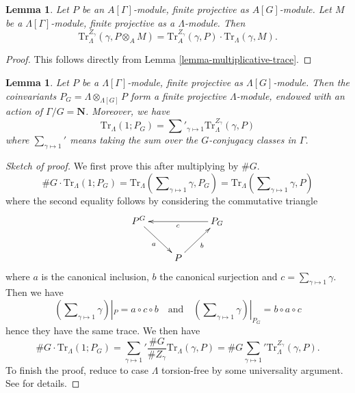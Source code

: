 \documentclass{stacks-project}
\theoremstyle{plain}
\newtheorem{lemma}[subsection]{Lemma}
\theoremstyle{definition}
\theoremstyle{remark}
\numberwithin{equation}{subsection}
\begin{document}
\begin{lemma}
\label{lemma-weak-trace}
Let $P$ be an $A[\Gamma]$-module, finite projective as $A[G]$-module. Let $M$
be a $\Lambda[\Gamma]$-module, finite projective as a $\Lambda$-module. Then
$$
\text{Tr}_{\Lambda}^{Z_\gamma}(\gamma, P \otimes_A M) =
\text{Tr}_A^{Z_\gamma}(\gamma, P)\cdot \text{Tr}_\Lambda(\gamma, M).
$$
\end{lemma}

\begin{proof}
This follows directly from Lemma \ref{lemma-multiplicative-trace}.
\end{proof}

\begin{lemma}
\label{lemma-trivial-trace}
Let $P$ be a $\Lambda[\Gamma]$-module, finite projective as
$\Lambda[G]$-module. Then the coinvariants
$P_G = \Lambda \otimes_{\Lambda[G]} P$
form a finite projective $\Lambda$-module, endowed with an action of
$\Gamma/G = \mathbf{N}$. Moreover, we have
$$
\text{Tr}_\Lambda(1; P_G) =
\sum\nolimits'_{\gamma \mapsto 1} \text{Tr}_\Lambda^{Z_\gamma}(\gamma, P)
$$
where $\sum_{\gamma\mapsto 1}'$ means taking the sum over the $G$-conjugacy
classes in $\Gamma$.
\end{lemma}

\begin{proof}[Sketch of proof]
We first prove this after multiplying by $\# G$.
$$
\# G\cdot \text{Tr}_\Lambda(1; P_G)
= \text{Tr}_\Lambda(\sum\nolimits_{\gamma\mapsto 1} \gamma, P_G)
= \text{Tr}_\Lambda(\sum\nolimits_{\gamma\mapsto 1} \gamma, P)
$$
where the second equality follows by considering the commutative triangle
$$
\xymatrix{
P^G \ar[rd]_a & & P_G \ar[ll]^c \\
& P \ar[ur]_b
}
$$
where $a$ is the canonical inclusion, $b$ the canonical surjection and $c =
\sum_{\gamma \mapsto 1} \gamma$. Then we have
$$
(\sum\nolimits_{\gamma \mapsto 1} \gamma) |_P = a \circ c \circ b
\quad\text{and}\quad
(\sum\nolimits_{\gamma \mapsto 1} \gamma) |_{P_G} = b \circ a \circ c
$$
hence they have the same trace. We then have
$$
\# G\cdot \text{Tr}_\Lambda(1; P_G)
=
{\sum_{\gamma\mapsto 1}}'
\frac{\# G}{\# Z_\gamma}\text{Tr}_\Lambda(\gamma, P)
= \# G{\sum_{\gamma\mapsto 1}}' \text{Tr}_\Lambda^{Z_\gamma}(\gamma, P).
$$
To finish the proof, reduce to case $\Lambda$ torsion-free by some universality
argument. See \cite{SGA4.5} for details.
\end{proof}
\end{document}
